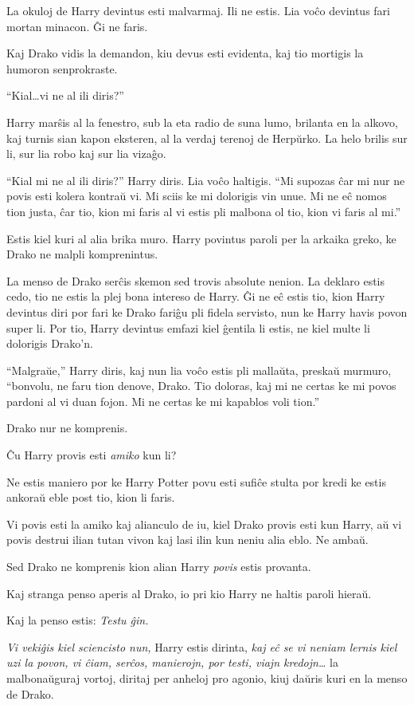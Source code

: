 La okuloj de Harry devintus esti malvarmaj. Ili ne estis. Lia voĉo
devintus fari mortan minacon. Ĝi ne faris.

Kaj Drako vidis la demandon, kiu devus esti evidenta, kaj tio mortigis la humoron senprokraste.

``Kial\ldots{}vi ne al ili diris?''

Harry marŝis al la fenestro, sub la eta radio de suna lumo, brilanta en la alkovo, kaj turnis sian kapon eksteren, al la verdaj terenoj de Herpŭrko. La helo brilis sur li, sur lia robo kaj sur lia vizaĝo.

``Kial mi ne al ili diris?'' Harry diris. Lia voĉo haltigis. ``Mi
supozas ĉar mi nur ne povis esti kolera kontraŭ vi. Mi sciis ke mi
dolorigis vin unue. Mi ne eĉ nomos tion justa, ĉar tio, kion mi faris
al vi estis pli malbona ol tio, kion vi faris al mi.''

Estis kiel kuri al alia brika muro. Harry povintus paroli per la arkaika greko, ke Drako ne malpli komprenintus.

La menso de Drako serĉis skemon sed trovis absolute nenion. La
deklaro estis cedo, tio ne estis la plej bona intereso de Harry.  Ĝi
ne eĉ estis tio, kion Harry devintus diri por fari ke Drako fariĝu pli
fidela servisto, nun ke Harry havis povon super li. Por tio, Harry
devintus emfazi kiel ĝentila li estis, ne kiel multe li dolorigis
Drako'n.

``Malgraŭe,'' Harry diris, kaj nun lia voĉo estis pli mallaŭta,
preskaŭ murmuro, ``bonvolu, ne faru tion denove, Drako. Tio doloras,
kaj mi ne certas ke mi povos pardoni al vi duan fojon. Mi ne certas ke
mi kapablos voli tion.''

Drako nur ne komprenis.

Ĉu Harry provis esti \emph{amiko} kun li?

Ne estis maniero por ke Harry Potter povu esti sufiĉe stulta por kredi
ke estis ankoraŭ eble post tio, kion li faris.

Vi povis esti la amiko kaj alianculo de iu, kiel Drako provis esti kun
Harry, aŭ vi povis destrui ilian tutan vivon kaj lasi ilin kun neniu
alia eblo. Ne ambaŭ.

Sed Drako ne komprenis kion alian Harry \emph{povis} estis provanta.

Kaj stranga penso aperis al Drako, io pri kio Harry ne haltis paroli
hieraŭ.

Kaj la penso estis: \emph{Testu ĝin.}

\emph{Vi vekiĝis kiel sciencisto nun,} Harry estis dirinta, \emph{kaj
  eĉ se vi neniam lernis kiel uzi la povon, vi ĉiam, serĉos,
  manierojn, por testi, viajn kredojn\ldots{}} la malbonaŭguraj
vortoj, diritaj per anheloj pro agonio, kiuj daŭris kuri en la menso
de Drako.

